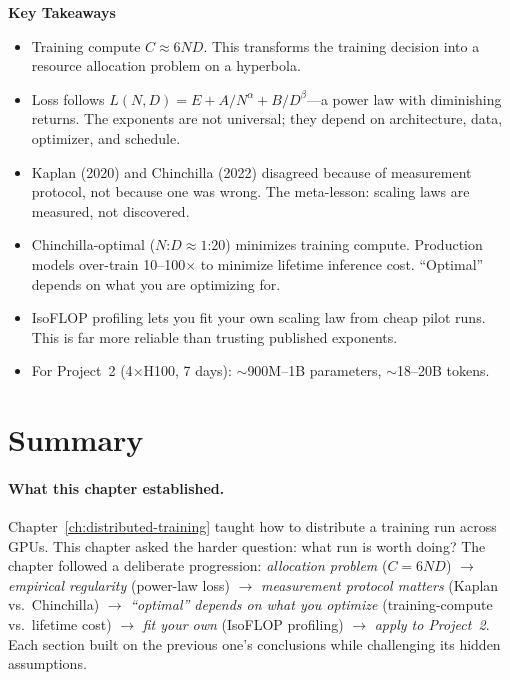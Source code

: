 \noindent{}


\begin{takeaways}
\textbf{Key Takeaways}
\begin{itemize}[nosep]
  \item Training compute $C \approx 6ND$. This transforms the training decision into a resource allocation problem on a hyperbola.
  \item Loss follows $L(N,D) = E + A/N^\alpha + B/D^\beta$---a power law with diminishing returns. The exponents are not universal; they depend on architecture, data, optimizer, and schedule.
  \item Kaplan (2020) and Chinchilla (2022) disagreed because of measurement protocol, not because one was wrong. The meta-lesson: scaling laws are measured, not discovered.
  \item Chinchilla-optimal ($N$:$D \approx 1$:$20$) minimizes training compute. Production models over-train 10--100$\times$ to minimize lifetime inference cost. ``Optimal'' depends on what you are optimizing for.
  \item IsoFLOP profiling lets you fit your own scaling law from cheap pilot runs. This is far more reliable than trusting published exponents.
  \item For Project~2 (4$\times$H100, 7 days): $\sim$900M--1B parameters, $\sim$18--20B tokens.
\end{itemize}
\end{takeaways}


\section{Summary}

\paragraph{What this chapter established.} Chapter~\ref{ch:distributed-training} taught how to distribute a training run across GPUs. This chapter asked the harder question: what run is worth doing? The chapter followed a deliberate progression: \emph{allocation problem} ($C = 6ND$) $\to$ \emph{empirical regularity} (power-law loss) $\to$ \emph{measurement protocol matters} (Kaplan vs.\ Chinchilla) $\to$ \emph{``optimal'' depends on what you optimize} (training-compute vs.\ lifetime cost) $\to$ \emph{fit your own} (IsoFLOP profiling) $\to$ \emph{apply to Project~2}. Each section built on the previous one's conclusions while challenging its hidden assumptions.

